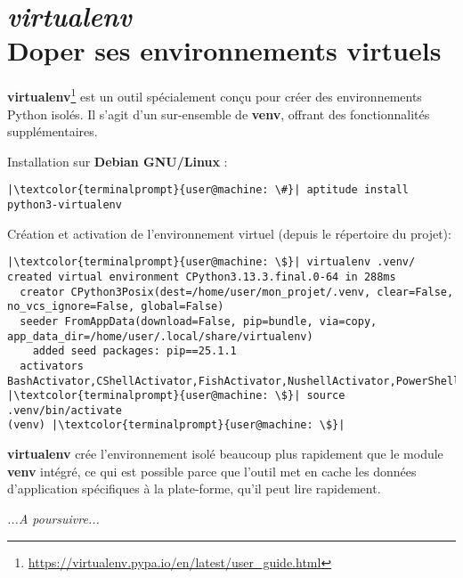 \chapter[\textit{virtualenv}]{\textit{virtualenv} \\ Doper ses environnements virtuels}

\bigskip

\textbf{virtualenv}\footnote{\url{https://virtualenv.pypa.io/en/latest/user_guide.html}} est un outil spécialement conçu pour créer des environnements Python isolés. Il s'agit d'un sur-ensemble de \textbf{venv}, offrant des fonctionnalités supplémentaires.

Installation sur \textbf{Debian GNU/Linux} :
\begin{lstlisting}[style=terminal]
|\textcolor{terminalprompt}{user@machine: \#}| aptitude install python3-virtualenv
\end{lstlisting}

Création et activation de l'environnement virtuel (depuis le répertoire du projet):
\begin{lstlisting}[style=terminal]
|\textcolor{terminalprompt}{user@machine: \$}| virtualenv .venv/
created virtual environment CPython3.13.3.final.0-64 in 288ms
  creator CPython3Posix(dest=/home/user/mon_projet/.venv, clear=False, no_vcs_ignore=False, global=False)
  seeder FromAppData(download=False, pip=bundle, via=copy, app_data_dir=/home/user/.local/share/virtualenv)
    added seed packages: pip==25.1.1
  activators BashActivator,CShellActivator,FishActivator,NushellActivator,PowerShellActivator,PythonActivator
|\textcolor{terminalprompt}{user@machine: \$}| source .venv/bin/activate
(venv) |\textcolor{terminalprompt}{user@machine: \$}|
\end{lstlisting}

\textbf{virtualenv} crée l'environnement isolé beaucoup plus rapidement que le module \textbf{venv} intégré, ce qui est possible parce que l'outil met en cache les données d'application spécifiques à la plate-forme, qu'il peut lire rapidement.

\textit{...A poursuivre...}

\begin{center}
\end{center}


